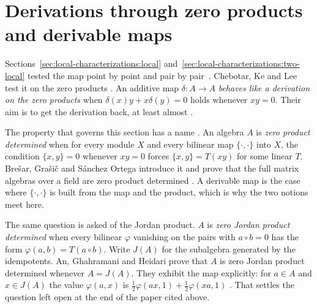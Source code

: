 \section{Derivations through zero products and derivable maps}\label{sec:local-characterizations:zero-products}

Sections~\ref{sec:local-characterizations:local}
and~\ref{sec:local-characterizations:two-local} tested the map point by
point and pair by pair~\cite[p.~217]{ChebotarKeLee2004}. Chebotar, Ke and Lee test it on the zero products
\cite[p.~217]{ChebotarKeLee2004}. An additive map $\delta\colon A\to A$
\emph{behaves like a derivation on the zero products} when
$\delta(x)y+x\delta(y)=0$ holds whenever $xy=0$. Their aim is to get the
derivation back, at least almost \cite[p.~217]{ChebotarKeLee2004}.

The property that governs this section has a name
\cite[p.~1487]{BresarGrasicSanchezOrtega2009}. An algebra $A$ is \emph{zero
product determined} \cite[p.~1487]{BresarGrasicSanchezOrtega2009} when for
every module $X$ and every bilinear map $\{\cdot,\cdot\}$ into $X$, the
condition $\{x,y\}=0$ whenever $xy=0$ forces $\{x,y\}=T(xy)$ for some linear
$T$. Bre\v{s}ar, Gra\v{s}i\v{c} and S\'anchez Ortega introduce it and prove
that the full matrix algebras over a field are zero product determined
\cite[p.~1487]{BresarGrasicSanchezOrtega2009}. A derivable map is the case
where $\{\cdot,\cdot\}$ is built from the map and the product, which is why
the two notions meet here.

The same question is asked of the Jordan product. $A$ is \emph{zero Jordan
product determined} \cite[p.~90]{AnGhahramaniHeidari2015ZeroJordan} when every
bilinear $\varphi$ vanishing on the pairs with $a\circ b=0$ has the form
$\varphi(a,b)=T(a\circ b)$. Write $J(A)$ for the subalgebra generated by the
idempotents. An, Ghahramani and Heidari prove that $A$ is zero Jordan product
determined whenever $A=J(A)$. They exhibit the map explicitly: for $a\in A$
and $x\in J(A)$ the value $\varphi(a,x)$ is
$\frac12\varphi(ax,1)+\frac12\varphi(xa,1)$ \cite[Theorem~2.1,
p.~91]{AnGhahramaniHeidari2015ZeroJordan}. That settles the question left open
at the end of the paper cited above.

